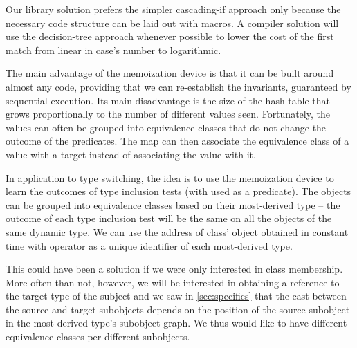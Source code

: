 \noindent
Our library solution prefers the simpler cascading-if approach only because the 
necessary code structure can be laid out with macros. A compiler solution 
will use the decision-tree approach whenever possible to lower the cost of the 
first match from linear in case's number to logarithmic. %


The main advantage of the memoization device is that it can be built around 
almost any code, providing that we can re-establish the invariants, guaranteed 
by sequential execution. Its main disadvantage is the size of the hash table 
that grows proportionally to the number of different values seen. Fortunately, 
the values can often be grouped into equivalence classes that do not change the 
outcome of the predicates. The map can then associate the equivalence class of a 
value with a target instead of associating the value with it. 

In application to type switching, the idea is to use the memoization device to 
learn the outcomes of type inclusion tests (with  used as a 
predicate). The objects can be grouped into equivalence classes based on their 
most-derived type -- the outcome of each type inclusion test will be the same on 
all the objects of the same dynamic type. We can use the  
address of class'  object obtained in constant time with 
 operator as a unique identifier of each most-derived type. 

This could have been a solution if we were only interested in class membership. 
More often than not, however, we will be interested in obtaining a reference to 
the target type of the subject and we saw in \textsection\ref{sec:specifics} 
that the cast between the source and target subobjects depends on 
the position of the source subobject in the most-derived type's subobject graph. 
We thus would like to have different equivalence classes per different 
subobjects. 

